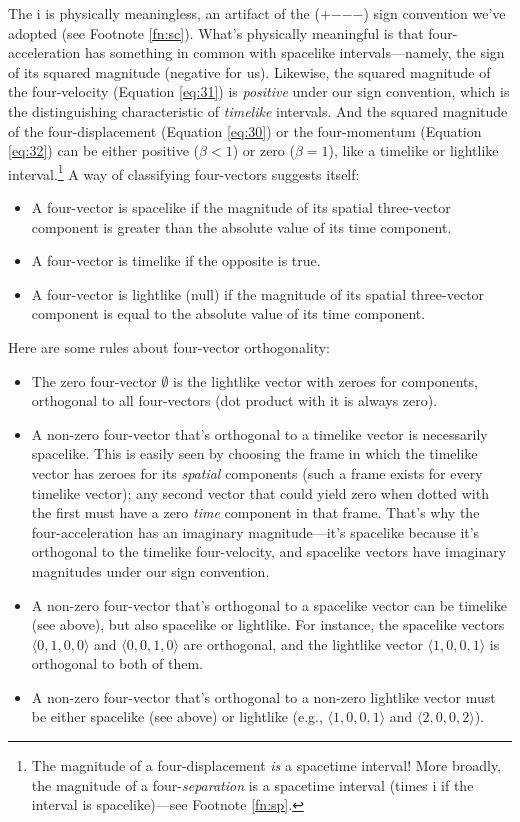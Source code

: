 \documentclass[12pt]{article}
\begin{document}
The $\mathrm{i}$ is physically meaningless, an artifact of the ($+$$-$$-$$-$) sign convention we've adopted (see Footnote \ref{fn:sc}). What's physically meaningful is that four-acceleration has something in common with spacelike intervals---namely, the sign of its squared magnitude (negative for us). Likewise, the squared magnitude of the four-velocity (Equation \ref{eq:31}) is \emph{positive} under our sign convention, which is the distinguishing characteristic of \emph{timelike} intervals. And the squared magnitude of the four-displacement (Equation \ref{eq:30}) or the four-momentum (Equation \ref{eq:32}) can be either positive ($\beta < 1$) or zero ($\beta = 1$), like a timelike or lightlike interval.\footnote{The magnitude of a four-displacement \emph{is} a spacetime interval! More broadly, the magnitude of a four-\emph{separation} is a spacetime interval (times $\mathrm{i}$ if the interval is spacelike)---see Footnote \ref{fn:sp}.} A way of classifying four-vectors suggests itself:
\begin{itemize}
\item A four-vector is spacelike if the magnitude of its spatial three-vector component is greater than the absolute value of its time component.
\item A four-vector is timelike if the opposite is true.
\item A four-vector is lightlike (null) if the magnitude of its spatial three-vector component is equal to the absolute value of its time component.
\end{itemize}
Here are some rules about four-vector orthogonality:
\begin{itemize}
\item The zero four-vector \mbox{\boldmath $\emptyset$} is the lightlike vector with zeroes for components, orthogonal to all four-vectors (dot product with it is always zero).
\item A non-zero four-vector that's orthogonal to a timelike vector is necessarily spacelike. This is easily seen by choosing the frame in which the timelike vector has zeroes for its \emph{spatial} components (such a frame exists for every timelike vector); any second vector that could yield zero when dotted with the first must have a zero \emph{time} component in that frame. That's why the four-acceleration has an imaginary magnitude---it's spacelike because it's orthogonal to the timelike four-velocity, and spacelike vectors have imaginary magnitudes under our sign convention.
\item A non-zero four-vector that's orthogonal to a spacelike vector can be timelike (see above), but also spacelike or lightlike. For instance, the spacelike vectors $\langle 0, 1, 0, 0 \rangle$ and $\langle 0, 0, 1, 0 \rangle$ are orthogonal, and the lightlike vector $\langle 1, 0, 0, 1 \rangle$ is orthogonal to both of them.
\item A non-zero four-vector that's orthogonal to a non-zero lightlike vector must be either spacelike (see above) or lightlike (e.g., $\langle 1, 0, 0, 1 \rangle$ and $\langle 2, 0, 0, 2 \rangle$).
\end{itemize}
\end{document}
